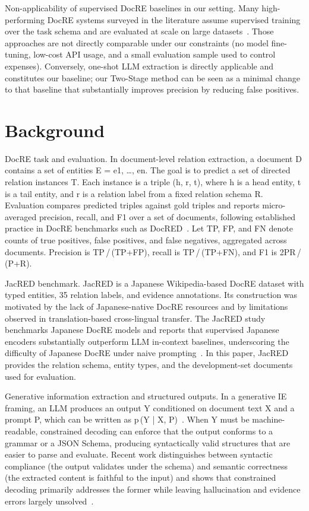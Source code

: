 \documentclass{article} %
\begin{document}
Non-applicability of supervised DocRE baselines in our setting. Many high-performing DocRE systems surveyed in the literature assume supervised training over the task schema and are evaluated at scale on large datasets~\cite{delaunay-2023-comprehensive}. Those approaches are not directly comparable under our constraints (no model fine-tuning, low-cost API usage, and a small evaluation sample used to control expenses). Conversely, one-shot LLM extraction is directly applicable and constitutes our baseline; our Two-Stage method can be seen as a minimal change to that baseline that substantially improves precision by reducing false positives.

\section{Background}\label{sec:background}
DocRE task and evaluation. In document-level relation extraction, a document D contains a set of entities E = {e1, …, en}. The goal is to predict a set of directed relation instances T. Each instance is a triple (h, r, t), where h is a head entity, t is a tail entity, and r is a relation label from a fixed relation schema R. Evaluation compares predicted triples against gold triples and reports micro-averaged precision, recall, and F1 over a set of documents, following established practice in DocRE benchmarks such as DocRED~\cite{yao-2019-docred}. Let TP, FP, and FN denote counts of true positives, false positives, and false negatives, aggregated across documents. Precision is TP\,/\,(TP+FP), recall is TP\,/\,(TP+FN), and F1 is 2PR\,/\,(P+R).

JacRED benchmark. JacRED is a Japanese Wikipedia-based DocRE dataset with typed entities, 35 relation labels, and evidence annotations. Its construction was motivated by the lack of Japanese-native DocRE resources and by limitations observed in translation-based cross-lingual transfer. The JacRED study benchmarks Japanese DocRE models and reports that supervised Japanese encoders substantially outperform LLM in-context baselines, underscoring the difficulty of Japanese DocRE under naive prompting~\cite{ma-2024-building}. In this paper, JacRED provides the relation schema, entity types, and the development-set documents used for evaluation.

Generative information extraction and structured outputs. In a generative IE framing, an LLM produces an output Y conditioned on document text X and a prompt P, which can be written as p\,(Y | X, P)~\cite{xu-2023-large}. When Y must be machine-readable, constrained decoding can enforce that the output conforms to a grammar or a JSON Schema, producing syntactically valid structures that are easier to parse and evaluate. Recent work distinguishes between syntactic compliance (the output validates under the schema) and semantic correctness (the extracted content is faithful to the input) and shows that constrained decoding primarily addresses the former while leaving hallucination and evidence errors largely unsolved~\cite{geng-2025-generating}.
\end{document}
